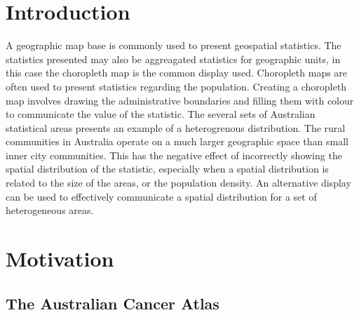 \documentclass[conference,final,]{IEEEtran}
\begin{document}



\maketitle


%
\IEEEpeerreviewmaketitle


\hypertarget{introduction}{%
\section{Introduction}\label{introduction}}

A geographic map base is commonly used to present geospatial statistics.
The statistics presented may also be aggreagated statistics for
geographic units, in this case the choropleth map is the common display
used. Choropleth maps are often used to present statistics regarding the
population. Creating a choropleth map involves drawing the
administrative boundaries and filling them with colour to communicate
the value of the statistic. The several sets of Australian statistical
areas presents an example of a heterogrenous distribution. The rural
communities in Australia operate on a much larger geographic space than
small inner city communities. This has the negative effect of
incorrectly showing the spatial distribution of the statistic,
especially when a spatial distribution is related to the size of the
areas, or the population density. An alternative display can be used to
effectively communicate a spatial distribution for a set of
heterogeneous areas.

\hypertarget{motivation}{%
\section{Motivation}\label{motivation}}

\hypertarget{the-australian-cancer-atlas}{%
\subsection{The Australian Cancer
Atlas}\label{the-australian-cancer-atlas}}
\end{document}
